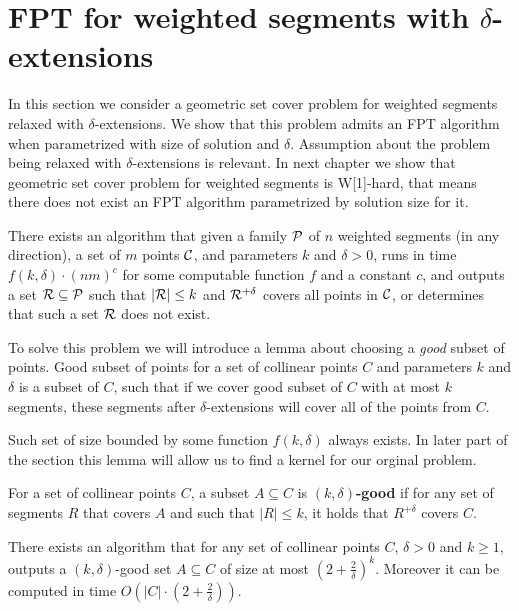 \section{FPT for weighted segments with $\delta$-extensions}

In this section we consider a geometric set cover problem
for weighted segments relaxed with $\delta$-extensions.
We show that this problem
admits an FPT algorithm when parametrized with size
of solution and $\delta$.
Assumption about the problem being relaxed with $\delta$-extensions is relevant.
In next chapter we show that geometric set cover problem
for weighted segments is W[1]-hard, that means
there does not exist an FPT algorithm parametrized by solution size for it.

\begin{tw}{
	\label{fpt_weighted_segment}
	There exists an algorithm that given a family $\mathcal{P}$ of
	$n$ weighted segments (in any direction),
	a set of $m$ points $\mathcal{C}$, and parameters $k$ and $\delta > 0$,
	runs in time $f(k, \delta) \cdot (nm)^c$ for some computable function $f$ and a constant $c$,
	and outputs a set $\mathcal{R} \subseteq \mathcal{P}$
	such that $|\mathcal{R}| \le k$ and $\mathcal{R}^{+\delta}$ covers all points in $\mathcal{C}$,
	or determines that such a set $\mathcal{R}$ does not exist.
}\end{tw}


To solve this problem we will introduce a lemma about choosing
a \textit{good} subset of points. Good subset of points
for a set of collinear points $C$ and parameters $k$ and $\delta$
is a subset of $C$, such that
if we cover good subset of $C$ with at most $k$ segments,
these segments after $\delta$-extensions will cover all of the points from $C$.

Such set of size bounded by some function $f(k, \delta)$ always exists.
In later part of the section this lemma will allow us to find a kernel
for our orginal problem.

\begin{defi}
	For a set of collinear points $C$,
	a subset $A \subseteq C$ is \textbf{$(k,\delta)$-good} 
	if for any set of segments $R$ that covers $A$ and
	such that $|R| \le k$, it holds that $R^{+\delta}$ covers $C$.
\end{defi}

\begin{lemma}
	\label{good_set_exists}
	There exists an algorithm that
	for any set of collinear points $C$, $\delta > 0$ and $k \ge 1$,
	outputs a $(k,\delta)$-good set $A \subseteq C$ of size
	at most $(2+\frac{2}{\delta})^k$.
	Moreover it can be computed in time $O(|C| \cdot (2+\frac{2}{\delta}))$.
\end{lemma}

